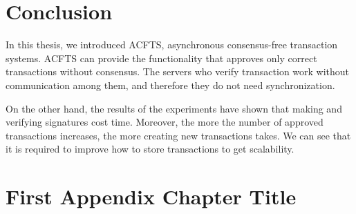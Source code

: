 \documentclass[a4paper, oneside]{discothesis}
\begin{document}
\chapter{Conclusion}
In this thesis, we introduced ACFTS, asynchronous consensus-free transaction systems.
ACFTS can provide the functionality that approves only correct transactions without consensus.
The servers who verify transaction work without communication among them,
and therefore they do not need synchronization.

On the other hand, the results of the experiments have shown that
making and verifying signatures cost time.
Moreover, the more the number of approved transactions increases,
the more creating new transactions takes.
We can see that it is required to improve how to store transactions to get scalability.







\appendix
\chapter{First Appendix Chapter Title}
\end{document}

